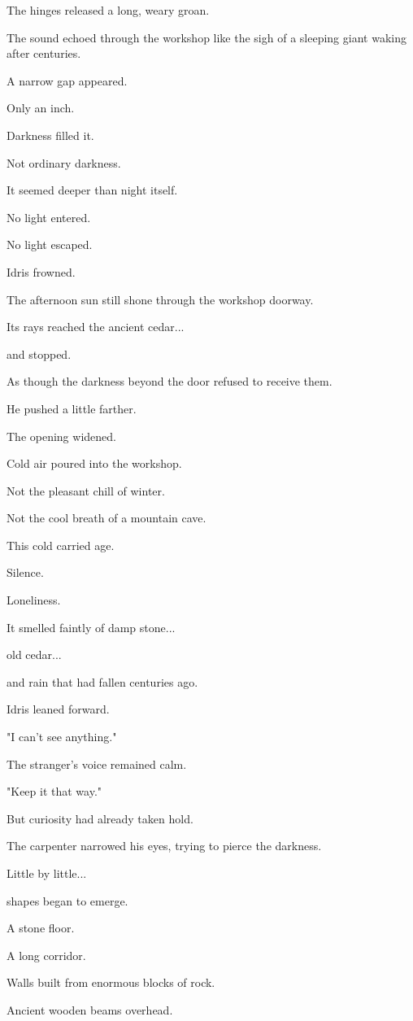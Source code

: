 \documentclass[12pt,openany]{book}
\begin{document}
The hinges released a long, weary groan.

The sound echoed through the workshop like the sigh of a sleeping giant waking after centuries.

A narrow gap appeared.

Only an inch.

Darkness filled it.

Not ordinary darkness.

It seemed deeper than night itself.

No light entered.

No light escaped.

Idris frowned.

The afternoon sun still shone through the workshop doorway.

Its rays reached the ancient cedar...

and stopped.

As though the darkness beyond the door refused to receive them.

He pushed a little farther.

The opening widened.

Cold air poured into the workshop.

Not the pleasant chill of winter.

Not the cool breath of a mountain cave.

This cold carried age.

Silence.

Loneliness.

It smelled faintly of damp stone...

old cedar...

and rain that had fallen centuries ago.

Idris leaned forward.

"I can't see anything."

The stranger's voice remained calm.

"Keep it that way."

But curiosity had already taken hold.

The carpenter narrowed his eyes, trying to pierce the darkness.

Little by little...

shapes began to emerge.

A stone floor.

A long corridor.

Walls built from enormous blocks of rock.

Ancient wooden beams overhead.
\end{document}
